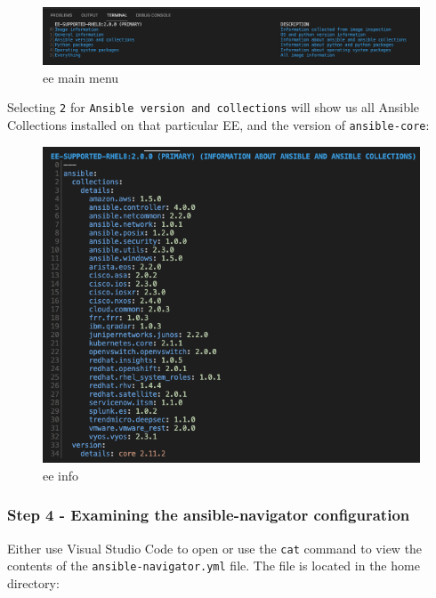 \begin{figure}[H]
\centering
\includegraphics{images/01_navigator-ee-menu.png}
\caption{ee main menu}
\end{figure}

Selecting \texttt{2} for \texttt{Ansible\ version\ and\ collections}
will show us all Ansible Collections installed on that particular EE,
and the version of \texttt{ansible-core}:

\begin{figure}[H]
\centering
\includegraphics{images/01_navigator-ee-collections.png}
\caption{ee info}
\end{figure}

\hypertarget{step-4---examining-the-ansible-navigator-configuration}{%
\subsubsection{Step 4 - Examining the ansible-navigator
configuration}\label{step-4---examining-the-ansible-navigator-configuration}}

Either use Visual Studio Code to open or use the \texttt{cat} command to
view the contents of the \texttt{ansible-navigator.yml} file. The file
is located in the home directory:

